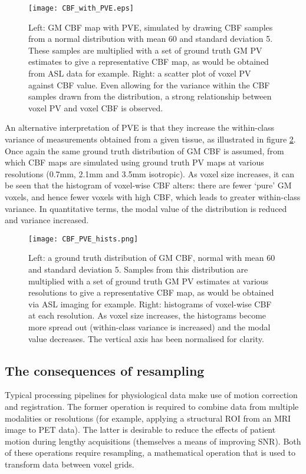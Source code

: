 \begin{figure}
\centering
\texttt{[image: CBF\_with\_PVE.eps]}
\caption{Left: GM CBF map with PVE, simulated by drawing CBF samples from a normal distribution with mean 60 and standard deviation 5. These samples are multiplied with a set of ground truth GM PV estimates to give a representative CBF map, as would be obtained from ASL data for example. Right: a scatter plot of voxel PV against CBF value. Even allowing for the variance within the CBF samples drawn from the distribution, a strong relationship between voxel PV and voxel CBF is observed.}
\label{CBF_with_PVE_demo}
\end{figure}

An alternative interpretation of PVE is that they increase the within-class variance of measurements obtained from a given tissue, as illustrated in figure \ref{CBF_PVE_hist_simple}. Once again the same ground truth distribution of GM CBF is assumed, from which CBF maps are simulated using ground truth PV maps at various resolutions (0.7mm, 2.1mm and 3.5mm isotropic). As voxel size increases, it can be seen that the histogram of voxel-wise CBF alters: there are fewer `pure' GM voxels, and hence fewer voxels with high CBF, which leads to greater within-class variance. In quantitative terms, the modal value of the distribution is reduced and variance increased. 

\begin{figure}
\centering
\texttt{[image: CBF\_PVE\_hists.png]}
\caption{Left: a ground truth distribution of GM CBF, normal with mean 60 and standard deviation 5. Samples from this distribution are multiplied with a set of ground truth GM PV estimates at various resolutions to give a representative CBF map, as would be obtained via ASL imaging for example. Right: histograms of voxel-wise CBF at each resolution. As voxel size increases, the histograms become more spread out (within-class variance is increased) and the modal value decreases. The vertical axis has been normalised for clarity.}
\label{CBF_PVE_hist_simple}
\end{figure}

\subsection{The consequences of resampling}

Typical processing pipelines for physiological data make use of motion correction and registration. The former operation is required to combine data from multiple modalities or resolutions (for example, applying a structural ROI from an MRI image to PET data). The latter is desirable to reduce the effects of patient motion during lengthy acquisitions (themselves a means of improving SNR). Both of these operations require resampling, a mathematical operation that is used to transform data between voxel grids.  

